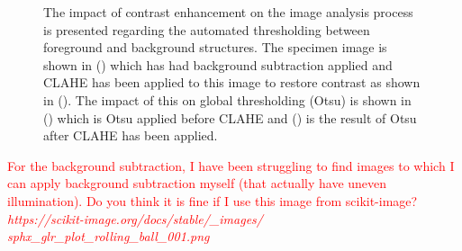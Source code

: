 \begin{figure}
    
    \caption[Visual showcase of the effect of contrast enhancement on image thresholding]{The impact of contrast enhancement on the image analysis process is presented regarding the automated thresholding between foreground and background structures. The specimen image is shown in () which has had background subtraction applied and CLAHE has been applied to this image to restore contrast as shown in (). The impact of this on global thresholding (Otsu) is shown in () which is Otsu applied before CLAHE and () is the result of Otsu after CLAHE has been applied.}
\end{figure}
\par
\textcolor{red}{For the background subtraction, I have been struggling to find images to which I can apply background subtraction myself (that actually have uneven illumination). Do you think it is fine if I use this image from scikit-image? \textit{https://scikit-image.org/docs/stable/\_images/\\sphx\_glr\_plot\_rolling\_ball\_001.png}}
